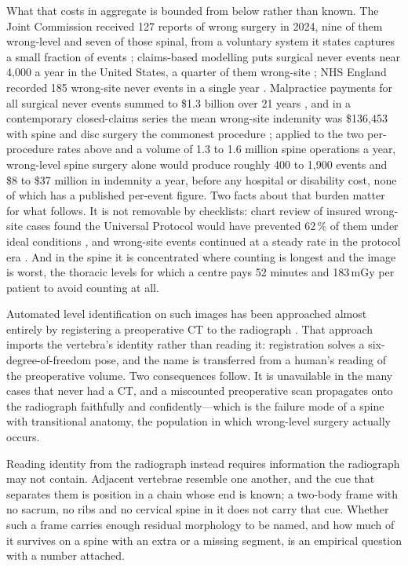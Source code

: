 \documentclass[11pt,letterpaper]{article}
\begin{document}
What that costs in aggregate is bounded from below rather than known. The Joint Commission received 127
reports of wrong surgery in 2024, nine of them wrong-level and seven of those spinal, from a voluntary
system it states captures a small fraction of events \citep{jc2024}; claims-based modelling puts surgical
never events near 4,000 a year in the United States, a quarter of them wrong-site \citep{mehtsun2013};
NHS England recorded 185 wrong-site never events in a single year \citep{nhse2025}. Malpractice payments
for all surgical never events summed to \$1.3 billion over 21 years \citep{mehtsun2013}, and in a
contemporary closed-claims series the mean wrong-site indemnity was \$136,453 with spine and disc surgery
the commonest procedure \citep{tan2023}; applied to the two per-procedure rates above and a volume of 1.3
to 1.6 million spine operations a year, wrong-level spine surgery alone would produce roughly 400 to 1,900
events and \$8 to \$37 million in indemnity a year, before any hospital or disability cost, none of which has
a published per-event figure. Two facts about that burden matter for what follows. It is not removable by
checklists: chart review of insured wrong-site cases found the Universal Protocol would have prevented
62\,\% of them under ideal conditions \citep{kwaan2006}, and wrong-site events continued at a steady rate in
the protocol era \citep{stahel2010}. And in the spine it is concentrated where counting is longest and the
image is worst, the thoracic levels for which a centre pays 52 minutes and 183\,mGy per patient to avoid
counting at all.

Automated level identification on such images has been approached almost entirely by registering a
preoperative CT to the radiograph \citep{levelcheck2012,otake2015}. That approach imports the vertebra's
identity rather than reading it: registration solves a six-degree-of-freedom pose, and the name is
transferred from a human's reading of the preoperative volume. Two consequences follow. It is unavailable in
the many cases that never had a CT, and a miscounted preoperative scan propagates onto the radiograph
faithfully and confidently---which is the failure mode of a spine with transitional anatomy, the population
in which wrong-level surgery actually occurs.

Reading identity from the radiograph instead requires information the radiograph may not contain. Adjacent
vertebrae resemble one another, and the cue that separates them is position in a chain whose end is known; a
two-body frame with no sacrum, no ribs and no cervical spine in it does not carry that cue. Whether such a
frame carries enough residual morphology to be named, and how much of it survives on a spine with an extra or
a missing segment, is an empirical question with a number attached.
\end{document}
